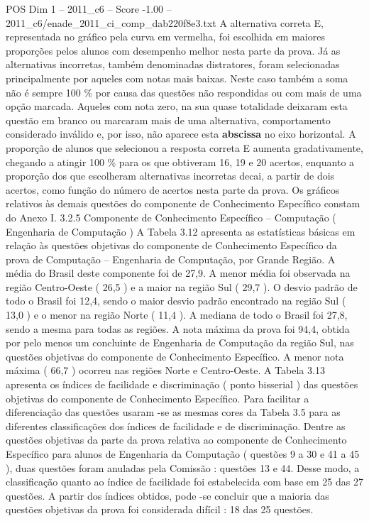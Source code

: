 \begin{textsample}{POS Dim 1 – 2011\_c6 – Score -1.00 – 2011\_c6/enade\_2011\_ci\_comp\_dab220f8e3.txt}
A alternativa correta E, representada no gráfico pela curva em vermelha, foi escolhida em maiores proporções pelos alunos com desempenho melhor nesta parte da prova.
Já as alternativas incorretas, também denominadas distratores, foram selecionadas principalmente por aqueles com notas mais baixas.
Neste caso também a soma não é sempre 100 \% por causa das questões não respondidas ou com mais de uma opção marcada.
Aqueles com nota zero, na sua quase totalidade deixaram esta questão em branco ou marcaram mais de uma alternativa, comportamento considerado inválido e, por isso, não aparece esta \textbf{abscissa} no eixo horizontal.
A proporção de alunos que selecionou a resposta correta E aumenta gradativamente, chegando a atingir 100 \% para os que obtiveram 16, 19 e 20 acertos, enquanto a proporção dos que escolheram alternativas incorretas decai, a partir de dois acertos, como função do número de acertos nesta parte da prova.
Os gráficos relativos às demais questões do componente de Conhecimento Específico constam do Anexo I. 3.2.5 Componente de Conhecimento Específico – Computação ( Engenharia de Computação ) A Tabela 3.12 apresenta as estatísticas básicas em relação às questões objetivas do componente de Conhecimento Específico da prova de Computação – Engenharia de Computação, por Grande Região.
A média do Brasil deste componente foi de 27,9.
A menor média foi observada na região Centro-Oeste ( 26,5 ) e a maior na região Sul ( 29,7 ).
O desvio padrão de todo o Brasil foi 12,4, sendo o maior desvio padrão encontrado na região Sul ( 13,0 ) e o menor na região Norte ( 11,4 ).
A mediana de todo o Brasil foi 27,8, sendo a mesma para todas as regiões.
A nota máxima da prova foi 94,4, obtida por pelo menos um concluinte de Engenharia de Computação da região Sul, nas questões objetivas do componente de Conhecimento Específico.
A menor nota máxima ( 66,7 ) ocorreu nas regiões Norte e Centro-Oeste.
A Tabela 3.13 apresenta os índices de facilidade e discriminação ( ponto bisserial ) das questões objetivas do componente de Conhecimento Específico.
Para facilitar a diferenciação das questões usaram -se as mesmas cores da Tabela 3.5 para as diferentes classificações dos índices de facilidade e de discriminação.
Dentre as questões objetivas da parte da prova relativa ao componente de Conhecimento Específico para alunos de Engenharia da Computação ( questões 9 a 30 e 41 a 45 ), duas questões foram anuladas pela Comissão : questões 13 e 44.
Desse modo, a classificação quanto ao índice de facilidade foi estabelecida com base em 25 das 27 questões.
A partir dos índices obtidos, pode -se concluir que a maioria das questões objetivas da prova foi considerada difícil : 18 das 25 questões.

\end{textsample}
